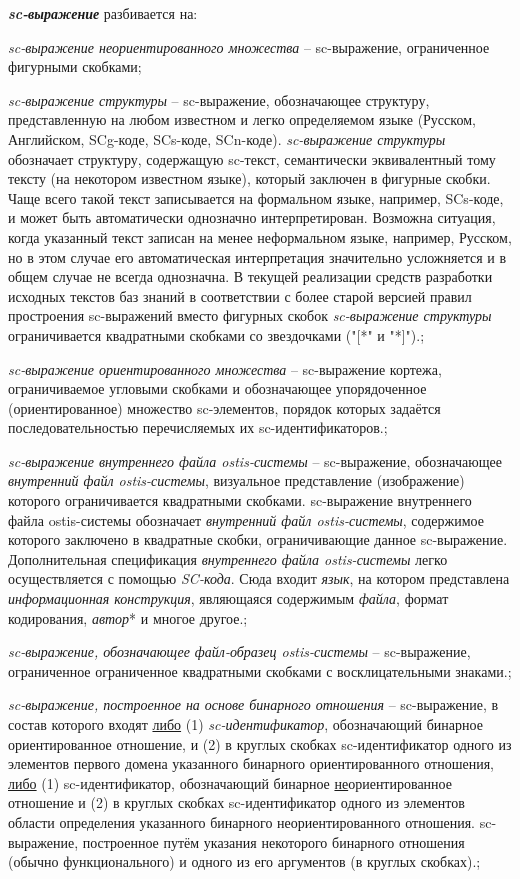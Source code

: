 \textbf{\textit{sc-выражение}} разбивается на:
\begin{textitemize}
	\item{\textit{sc-выражение неориентированного множества} -- sc-выражение, ограниченное фигурными скобками};
	\item{\textit{sc-выражение структуры} -- sc-выражение, обозначающее структуру, представленную на любом известном и легко определяемом языке (Русском, Английском, SCg-коде, SCs-коде, SCn-коде).
	\textit{sc-выражение структуры} обозначает структуру, содержащую sc-текст, семантически эквивалентный тому тексту (на некотором известном языке), который заключен в фигурные скобки. Чаще всего такой текст записывается на формальном языке, например, SCs-коде, и может быть автоматически однозначно интерпретирован. Возможна ситуация, когда указанный текст записан на менее неформальном языке, например, Русском, но в этом случае его автоматическая интерпретация значительно усложняется и в общем случае не всегда однозначна.
	В текущей реализации средств разработки исходных текстов баз знаний в соответствии с более старой версией правил простроения sc-выражений вместо фигурных скобок \textit{sc-выражение структуры} ограничивается квадратными скобками со звездочками ("[*"{} и "*]"{}).};
	\item{\textit{sc-выражение ориентированного множества} -- sc-выражение кортежа, ограничиваемое угловыми скобками и обозначающее упорядоченное (ориентированное) множество sc-элементов, порядок которых задаётся последовательностью перечисляемых их sc-идентификаторов.};
	\item{\textit{sc-выражение внутреннего файла ostis-системы} -- sc-выражение, обозначающее \textit{внутренний файл ostis-системы}, визуальное представление (изображение) которого ограничивается квадратными скобками. sc-выражение внутреннего файла ostis-системы обозначает \textit{внутренний файл ostis-системы}, содержимое которого заключено в квадратные скобки, ограничивающие данное sc-выражение.
	Дополнительная спецификация \textit{внутреннего файла ostis-системы} легко осуществляется с помощью \textit{SC-кода}. Сюда входит \textit{язык}, на котором представлена \textit{информационная конструкция}, являющаяся содержимым \textit{файла}, формат кодирования, \textit{автор}* и многое другое.};
	\item{\textit{sc-выражение, обозначающее файл-образец ostis-системы} -- sc-выражение, ограниченное ограниченное квадратными скобками с восклицательными знаками.};
	\item{\textit{sc-выражение, построенное на основе бинарного отношения} -- sc-выражение, в состав которого входят \uline{либо} (1) \textit{sc-идентификатор}, обозначающий бинарное ориентированное отношение, и (2) в круглых скобках sc-идентификатор одного из элементов первого домена указанного бинарного ориентированного отношения, \uline{либо} (1) sc-идентификатор, обозначающий бинарное \uline{не}ориентированное отношение и (2) в круглых скобках sc-идентификатор одного из элементов области определения указанного бинарного неориентированного отношения. sc-выражение, построенное путём указания некоторого бинарного отношения (обычно функционального) и одного из его аргументов (в круглых скобках).};

\end{textitemize}
